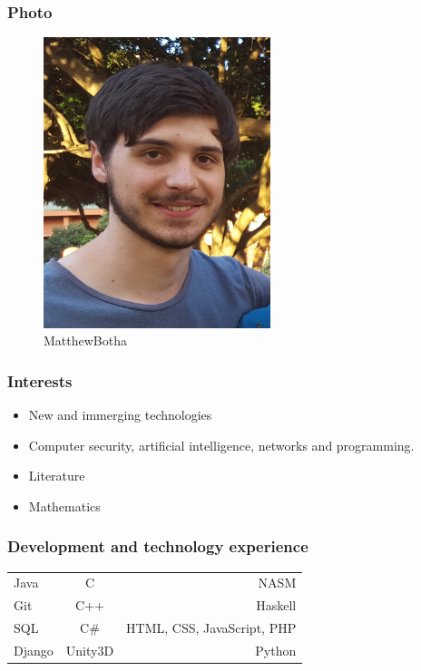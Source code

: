 \documentclass{article}
\begin{document}
		\subsubsection{Photo}
		\begin{figure}[H]
			\centering
			\includegraphics[width=250px]{../Matt.jpg}
			\caption{MatthewBotha}
		\end{figure}
		\subsubsection{Interests}
		\begin{itemize}
			\item New and immerging technologies
			\item Computer security, artificial intelligence, networks and programming.
			\item Literature
			\item Mathematics
		\end{itemize}
		
\subsubsection{Development and technology experience}
			\begin{tabular}{| l | c | r |}
				Java   & C		& NASM                        \\
				Git    & C++      & Haskell                     \\
				SQL    & C\#	& HTML, CSS, JavaScript, PHP   \\
				Django & Unity3D	& Python	
			\end{tabular}
		
\end{document}
